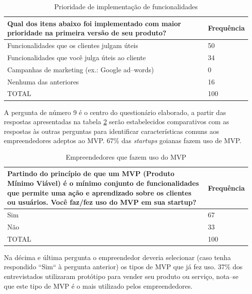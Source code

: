 \begin{table}[hb]
\centering
\caption{Prioridade de implementa\c{c}\~ao de funcionalidades}
\label{tab:pergunta8}
\begin{tabular}{|p{10cm}|p{2cm}|}
\hline{\bf Qual dos itens abaixo foi implementado com maior prioridade na primeira vers\~ao de seu produto?} & {\bf Frequ\^encia}\\
\hline Funcionalidades que os clientes julgam \'uteis & 50\\
\hline Funcionalidades que voc\^e julga \'uteis ao cliente & 34\\
\hline Campanhas de marketing (ex.: Google ad--words) & 0\\
\hline Nenhuma das anteriores & 16\\
\hline TOTAL & 100\\
\hline
\end{tabular}
\end{table}

A pergunta de n\'umero 9 \'e o centro do question\'ario elaborado, a partir das respostas apresentadas na tabela \ref{tab:pergunta9} ser\~ao estabelecidos comparativos com as respostas \`as outras perguntas para identificar caracter\'isticas comuns aos empreendedores adeptos ao MVP. 67\% das \emph{startups} goianas fazem uso de MVP.

\begin{table}[hb]
\centering
\caption{Empreendedores que fazem uso do MVP}
\label{tab:pergunta9}
\begin{tabular}{|p{10cm}|p{2cm}|}
\hline{\bf Partindo do princ\'ipio de que um MVP (Produto M\'inimo Vi\'avel) \'e o m\'inimo conjunto de funcionalidades que permite uma a\c{c}\~ao e aprendizado sobre os clientes ou usu\'arios. Voc\^e faz/fez uso do MVP  em sua startup?} & {\bf Frequ\^encia}\\
\hline Sim & 67\\
\hline N\~ao & 33\\
\hline TOTAL & 100\\
\hline
\end{tabular}
\end{table}

\pagebreak

Na d\'ecima e \'ultima pergunta o empreendedor deveria selecionar (caso tenha respondido ``Sim`` \`a pergunta anterior) os tipos de MVP que j\'a fez uso. 37\% dos entrevistados utilizaram prot\'otipo para vender seu produto ou servi\c{c}o, nota--se que este tipo de MVP \'e o mais utilizado pelos empreendedores.


